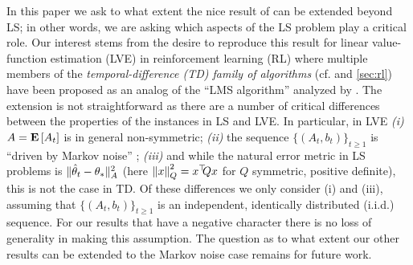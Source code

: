 In this paper we ask to what extent the nice result 
of \citet{bach-moulines} can be extended beyond LS;
in other words, we are asking which aspects of the LS problem play a critical role. 
Our interest stems from the desire to reproduce this result for
linear value-function estimation (LVE) in reinforcement learning (RL) where
multiple members of the
\emph{temporal-difference (TD) family of algorithms} 
(cf. \cite{sutton,gtd,gtd2,gtdmp} and \cref{sec:rl})
have been proposed as an analog of the ``LMS algorithm'' analyzed by 
\citet{bach-moulines}.
The extension is not straightforward as there are a number of critical differences
between the properties of the instances in LS and LVE.
In particular,  in LVE
{\em (i)}  $A=\mathbf{E}\left[A_t\right]$ is in general non-symmetric;
{\em (ii)} the sequence  $\{(A_t,b_t)\}_{t\ge 1}$ is ``driven by Markov noise'' \cite{tsivan95,tsivan97};
{\em (iii)} and while the natural error metric in LS problems is $\| \hat{\theta}_t-\theta_*\|_{A}^2$
(here $\left\| x\right\|_Q^2 = x^\top\!\!Q x$ for $Q$ symmetric, positive definite), 
this is not the case in TD.
Of these differences we only consider (i) and (iii), assuming that $\{(A_t,b_t)\}_{t\ge 1}$ is an independent, identically distributed (i.i.d.) sequence. 
For our results that have a negative character there is no loss of generality in 
making this assumption. 
The question as to what extent our other results can be extended to the Markov noise
case remains for future work. 

\iffalse
\if0
In particular, the convergence rates can degrade, or they may depend on potentially unbounded problem dependent constants \cite{bach-moulines}. Diminishing stepsizes such as $\alpha_t=\frac{c_0}{t+c}$, with problem instance specific tuning of the constants $c>0,c_0>0$ have been used in practice \cite{gtd2,gtdmp,konda-tsitsiklis}. 
An alternate idea, which we call the constant stepsize averaged LSA (CALSA) is to run \eqref{eq:lsaintro} by choosing $\alpha_t=\alpha>0$ $\forall t> 0$ with some $\alpha>0$, and output the average $\thh_t\eqdef\frac{1}{t+1}\sum_{s=0}^t \theta_s$. Thus, in CALSA, $\theta_t$ is an internal variable and $\thh_t$ is the output of the algorithm. The idea is that the constant stepsize leads to faster forgetting of initial conditions, while the averaging on the top reduces noise. This idea goes back to  \citet{ruppert} and \citet{polyak-judisky} who proposed it in the context of stochastic approximation that LSA is a special case of.   
\fi

